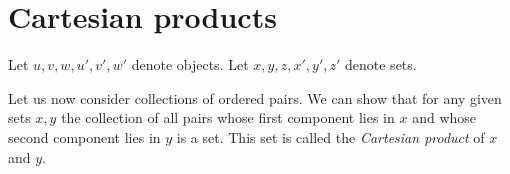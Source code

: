 \documentclass[../../set-theory.ftl.tex]{subfiles}
\begin{document}
  \begin{comment}
    \begin{forthel}

    \end{forthel}
  \end{comment}


  \section{Cartesian products}

  \begin{forthel}
  \end{forthel}

  \begin{forthel}
  \end{forthel}

  \begin{forthel}
    Let $u,v,w,u',v',w'$ denote objects.
    Let $x,y,z,x',y',z'$ denote sets.
  \end{forthel}

  \noindent Let us now consider collections of ordered pairs.
  We can show that for any given sets $x,y$ the collection of all pairs whose
  first component lies in $x$ and whose second component lies in $y$ is a set.
  This set is called the \textit{Cartesian product} of $x$ and $y$.
\end{document}
